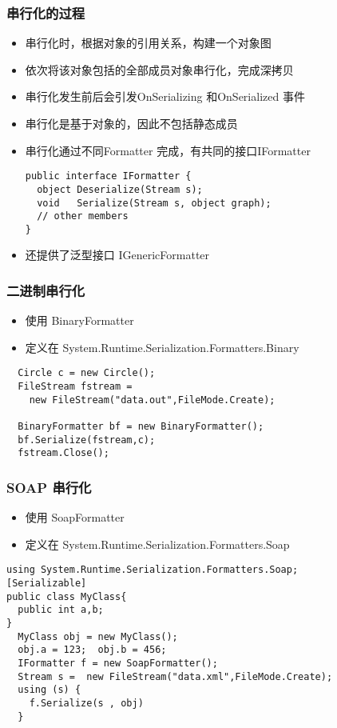 \begin{frame}[fragile]
\frametitle{串行化的过程}
\begin{itemize}
\item 串行化时，根据对象的引用关系，构建一个对象图
\item 依次将该对象包括的全部成员对象串行化，完成深拷贝
\item 串行化发生前后会引发OnSerializing 和OnSerialized 事件
\item 串行化是基于对象的，因此不包括静态成员
\medskip \pause
\item 串行化通过不同Formatter 完成，有共同的接口IFormatter
\begin{lstlisting}
public interface IFormatter {
  object Deserialize(Stream s);
  void   Serialize(Stream s, object graph);
  // other members
}
\end{lstlisting}
\item 还提供了泛型接口 IGenericFormatter
\end{itemize}
\end{frame}

\begin{frame}[fragile]
\frametitle{二进制串行化}
\begin{itemize}
\item 使用 BinaryFormatter 
\item 定义在 System.Runtime.Serialization.Formatters.Binary
\end{itemize}
\begin{lstlisting}
  Circle c = new Circle();
  FileStream fstream = 
    new FileStream("data.out",FileMode.Create);
 
  BinaryFormatter bf = new BinaryFormatter();
  bf.Serialize(fstream,c);
  fstream.Close();
\end{lstlisting}
\end{frame}

\begin{frame}[fragile]
\frametitle{SOAP 串行化}
\begin{itemize}
\item 使用 SoapFormatter
\item 定义在 System.Runtime.Serialization.Formatters.Soap
\end{itemize}
\begin{lstlisting}
using System.Runtime.Serialization.Formatters.Soap;
[Serializable]
public class MyClass{
  public int a,b;
}
  MyClass obj = new MyClass();
  obj.a = 123;  obj.b = 456;
  IFormatter f = new SoapFormatter();
  Stream s =  new FileStream("data.xml",FileMode.Create);
  using (s) {
    f.Serialize(s , obj)
  }
\end{lstlisting}
\end{frame}

